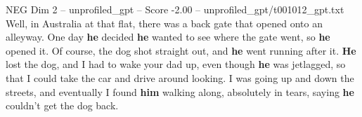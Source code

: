 \begin{textsample}{NEG Dim 2 – unprofiled\_gpt – Score -2.00 – unprofiled\_gpt/t001012\_gpt.txt}  \label{ex:f2_neg_029}
Well, in Australia at that flat, there was a back gate that opened onto an alleyway.
One day \textbf{he} decided \textbf{he} wanted to see where the gate went, so \textbf{he} opened it.
Of course, the dog shot straight out, and \textbf{he} went running after it. \textbf{He} lost the dog, and I had to wake your dad up, even though \textbf{he} was jetlagged, so that I could take the car and drive around looking.
I was going up and down the streets, and eventually I found \textbf{him} walking along, absolutely in tears, saying \textbf{he} couldn't get the dog back.

\end{textsample}
